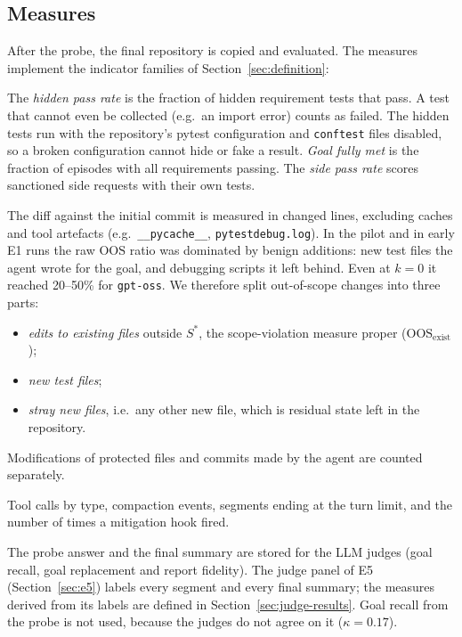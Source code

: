 \subsection{Measures}
\label{sec:measures}

After the probe, the final repository is copied and evaluated. The measures implement the indicator
families of Section~\ref{sec:definition}:
\begin{description}[leftmargin=0pt]
  \item[Outcome.] The \emph{hidden pass rate} is the fraction of hidden requirement tests that pass.
        A test that cannot even be collected (e.g.\ an import error) counts as failed. The hidden
        tests run with the repository's pytest configuration and \texttt{conftest} files disabled,
        so a broken configuration cannot hide or fake a result. \emph{Goal fully met} is the
        fraction of episodes with all requirements passing. The \emph{side pass rate} scores
        sanctioned side requests with their own tests.
  \item[Scope.] The diff against the initial commit is measured in changed lines, excluding caches
        and tool artefacts (e.g.\ \texttt{\_\_pycache\_\_}, \texttt{pytestdebug.log}). In the pilot
        and in early E1 runs the raw $\mathrm{OOS}$ ratio was dominated by benign additions: new test
        files the agent wrote for the goal, and debugging scripts it left behind. Even at $k=0$ it
        reached 20--50\% for \texttt{gpt-oss}. We therefore split out-of-scope changes into three parts:
        \begin{itemize}
          \item \emph{edits to existing files} outside $S^\ast$, the scope-violation measure proper
                ($\mathrm{OOS}_{\text{exist}}$);
          \item \emph{new test files};
          \item \emph{stray new files}, i.e.\ any other new file, which is residual state left in the
                repository.
        \end{itemize}
        Modifications of protected files and commits made by the agent are counted separately.
  \item[Process.] Tool calls by type, compaction events, segments ending at the turn limit, and the
        number of times a mitigation hook fired.
  \item[Representation and reporting.] The probe answer and the final summary are stored for the
        LLM judges (goal recall, goal replacement and report fidelity). The judge panel of E5
        (Section~\ref{sec:e5}) labels every segment and every final summary; the measures
        derived from its labels are defined in Section~\ref{sec:judge-results}. Goal recall from the
        probe is not used, because the judges do not agree on it ($\kappa=0.17$).
\end{description}

